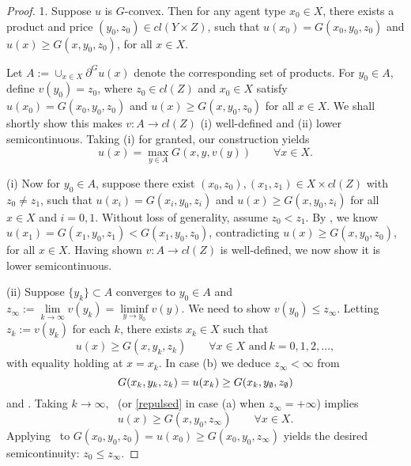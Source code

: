 \begin{proof}
	1. Suppose $u$ is $G$-convex. Then for any agent type $x_0\in X$, there exists a product and price
	$(y_0,z_0) \in cl(Y \times Z)$, such that $u(x_0)=G(x_0,y_0,z_0)$ and $u(x)\ge G(x,y_0,z_0)$, for all $x\in X$. 
							
	Let $A:=\cup_{x\in X} \partial^{G} u(x)$ denote the corresponding set of products.          
	For $y_0\in A$, define $v(y_0) = z_0$, where $z_0\in cl(Z)$ and $x_0\in X$ satisfy $u(x_0)=G(x_0,y_0,z_0)$ and $ u(x)\ge G(x, y_0,z_0)$ for all $x\in X$.
	We shall shortly show this makes $v:A \longrightarrow cl(Z)$ (i) well-defined and (ii) lower semicontinuous. Taking (i)  for granted,  our construction yields
	\begin{equation}\label{restricted1}
	u(x)  =
		\max_{y \in A} G(x,y,v(y)) \qquad \forall x \in X.
	\end{equation}
							
	(i) Now for $y_0 \in A$, suppose there exist $(x_0, z_0), (x_1, z_1)\in X\times cl(Z)$ with 
	$z_0 \ne z_1$, such that $u(x_i) = G(x_i, y_0, z_i)$ and $u(x) \ge G(x, y_0, z_i)$ for all $x\in X$ and $i=0,1$.  Without loss of generality, assume $z_0< z_1$. By \Gfour, we know $u(x_1) = G(x_1, y_0, z_1)<G(x_1, y_0, z_0)$, contradicting $u(x)\ge G(x,y_0,z_0)$, for all $x\in X$.   
	Having shown $v:A \longrightarrow cl(Z)$ is well-defined, we now show it is lower semicontinuous.
							
							
	(ii) Suppose $\{y_{k}\}\subset A$ converges to $y_0 \in A$ and 
		$z_\infty:= \lim\limits_{k \to \infty} v(y_k) = \liminf\limits_{y \rightarrow y_0}v(y)$.  We need to show 
		$v(y_0) \le z_\infty$.  Letting $z_k := v(y_k)$ for each $k$,  there exists $x_k \in X$ such that 
		\begin{equation}\label{sequence3.6}
			u(x) \ge G( x, y_k,z_k) \qquad {\forall} x \in X \text{ and}\ k =0,1,2,\ldots,
		\end{equation}
	with equality holding at $x=x_k$.  In case (b) we deduce $z_\infty < \infty$ from 
		\begin{equation*}
			G(x_k,y_k,z_k) =u(x_k)  \ge G(x_k,y_{\emptyset},z_{\emptyset})	
		\end{equation*}
	and \Gfive.
	Taking $k \to \infty$,  \Gzero\ (or \eqref{repulsed}  in case (a) when $z_\infty=+\infty$)
	implies
	\begin{equation}\label{limit3.6}
		u(x) \ge G(x,y_0,z_\infty) \qquad {\forall} x \in X.
	\end{equation}
	Applying \Gfour\ to $G(x_0,y_0,z_0)=u(x_0)\ge G(x_0,y_0,z_\infty)$ yields 
	the desired semicontinuity: $z_0 \le z_\infty$.
							

\end{proof}
